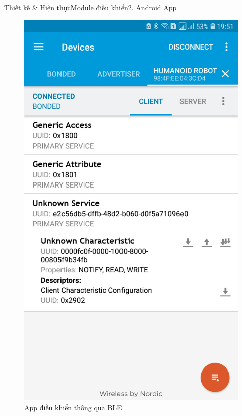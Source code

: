 \documentclass[compress, blue, 13pt,hyperref={pdfpagemode=FullScreen}]{beamer}
\begin{document}
\begin{frame}{Thiết kế \& Hiện thực}{Module điều khiển}{2. Android App}
\begin{figure}[hbtp]
\centering
\includegraphics[scale=0.085]{images/Screenshot_20180607-195153_nRFConnect.jpg}
\caption{App điều khiển thông qua BLE}
\end{figure}
\end{frame}
\end{document}

